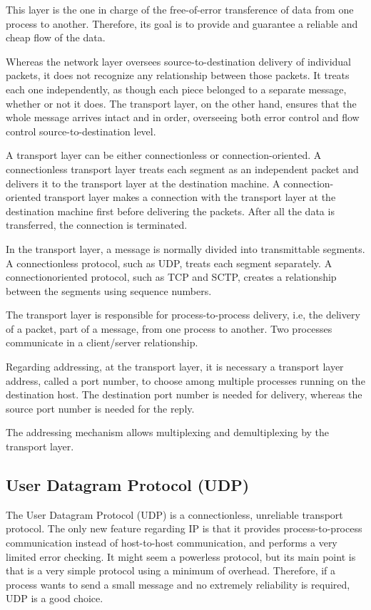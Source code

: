 This layer is the one in charge of the free-of-error transference of data from one process to another. Therefore, its goal is to provide and guarantee a reliable and cheap flow of the data. 

Whereas the network layer oversees source-to-destination delivery of individual packets, it does not recognize any relationship between those packets. It treats each one independently, as though each piece belonged to a separate message, whether or not it does. The transport layer, on the other hand, ensures that the whole message arrives intact and in order, overseeing both error control and flow control source-to-destination level. 

A transport layer can be either connectionless or connection-oriented. A connectionless transport layer treats each segment as an independent packet and delivers it to the transport layer at the destination machine. A connection-oriented transport layer makes a connection with the transport layer at the destination machine first before delivering the packets. After all the data is transferred, the connection is terminated.

In the transport layer, a message is normally divided into transmittable segments. A connectionless protocol, such as UDP, treats each segment separately. A connectionoriented protocol, such as TCP and SCTP, creates a relationship between the segments using sequence numbers.

The transport layer is responsible for process-to-process delivery, i.e, the delivery of a packet, part of a message, from one process to another. Two processes communicate in a client/server relationship. 

Regarding addressing, at the transport layer, it is necessary a transport layer address, called a port number, to choose among multiple processes running on the destination host. The destination port number is needed for delivery, whereas the source port number is needed for the reply. 

The addressing mechanism allows multiplexing and demultiplexing by the transport layer.
	
\subsection{User Datagram Protocol (UDP)}
The User Datagram Protocol (UDP) is a connectionless, unreliable transport protocol. The only new feature regarding IP is that it provides process-to-process communication instead of host-to-host communication, and performs a very limited error checking. It might seem a powerless protocol, but its main point is that is a very simple protocol using a minimum of overhead. Therefore, if a process wants to send a small message and no extremely reliability is required, UDP is a good choice. 

